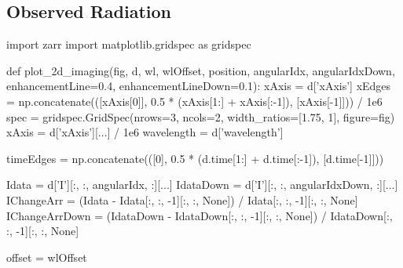 \subsection{Observed Radiation}




\begin{pycode}[2DRT]
import zarr
import matplotlib.gridspec as gridspec


def plot_2d_imaging(fig, d, wl, wlOffset, position, angularIdx,
                    angularIdxDown, enhancementLine=0.4, enhancementLineDown=0.1):
    xAxis = d['xAxis']
    xEdges = np.concatenate(([xAxis[0]], 0.5 * (xAxis[1:] + xAxis[:-1]), [xAxis[-1]])) / 1e6
    spec = gridspec.GridSpec(nrows=3, ncols=2, width_ratios=[1.75, 1], figure=fig)
    xAxis = d['xAxis'][...] / 1e6
    wavelength = d['wavelength']

    timeEdges = np.concatenate(([0],
                                0.5 * (d.time[1:] + d.time[:-1]),
                                [d.time[-1]]))

    Idata = d['I'][:, :, angularIdx, :][...]
    IdataDown = d['I'][:, :, angularIdxDown, :][...]
    IChangeArr = (Idata - Idata[:, :, -1][:, :, None]) / Idata[:, :, -1][:, :, None]
    IChangeArrDown = (IdataDown - IdataDown[:, :, -1][:, :, None]) / IdataDown[:, :, -1][:, :, None]

    offset = wlOffset


\end{pycode}
